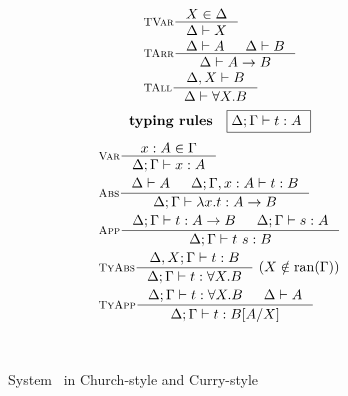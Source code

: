 \begin{figure}
\begin{singlespace}
\begin{minipage}{.46\textwidth}
\begin{align*}
& \inference[\sc TVar]{X \in \Delta}{\Delta |- X} \\
& \inference[\sc TArr]{\Delta |- A & \Delta |- B}{\Delta |- A -> B} \\
& \inference[\sc TAll]{\Delta,X |- B}{\Delta |- \forall X.B} \\
\end{align*}
\[ \textbf{typing rules} \quad \framebox{$ \Delta;\Gamma |- t : A $ } \]
\vspace*{-1em}
\begin{align*}
& \inference[\sc Var]{x:A \in \Gamma}{\Delta;\Gamma |- x:A} \\
& \inference[\sc Abs]{\Delta |- A & \Delta;\Gamma,x:A |- t : B}
		     {\Delta;\Gamma |- \l x   .t : A -> B} \\
& \inference[\sc App]{\Delta;\Gamma |- t : A -> B & \Delta;\Gamma |- s : A}
		     {\Delta;\Gamma |- t~s : B} \\
& \inference[\sc TyAbs]{\Delta,X;\Gamma |- t : B}
		       {\Delta;\Gamma |- t : \forall X.B} ~
		       (X\notin\ran(\Gamma)) \\
& \inference[\sc TyApp]{\Delta;\Gamma |- t : \forall X.B & \Delta |- A}
		       {\Delta;\Gamma |- t : B[A/X]}
\end{align*}
\end{minipage}
~\\
\caption{System \F\ in Church-style and Curry-style}
\label{fig:f}
\end{singlespace}
\end{figure}

